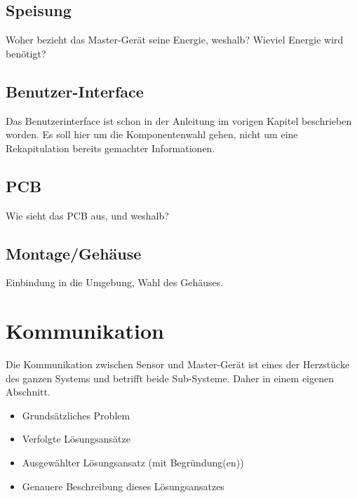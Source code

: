 \subsection{Speisung}
\label{subsec:mastergerat:speisung}

Woher bezieht das Master-Ger\"at  seine Energie, weshalb? Wieviel Energie wird
ben\"otigt?


\subsection{Benutzer-Interface}
\label{subsec:mastergerat:interface}

\anweisung Das Benutzerinterface ist schon in der Anleitung im vorigen Kapitel
beschrieben worden. Es soll  hier um die Komponentenwahl gehen,  nicht um eine
Rekapitulation bereits gemachter Informationen.

\subsection{PCB}
\label{subsec:mastergerat:pcb}

Wie sieht das PCB aus, und weshalb?

\subsection{Montage/Geh\"ause}
\label{subsec:mastergerat:pcb}

Einbindung in die Umgebung, Wahl des Geh\"auses.


\section{Kommunikation}
\label{sec:kommunikation}

Die   Kommunikation  zwischen   Sensor  und   Master-Ger\"at  ist   eines  der
Herzst\"ucke des ganzen Systems und betrifft beide Sub-Systeme. Daher in einem
eigenen Abschnitt.

\begin{itemize}
    \item
        Grunds\"atzliches Problem
    \item
        Verfolgte L\"osungsans\"atze
    \item
        Ausgew\"ahlter L\"osungsansatz (mit Begr\"undung(en))
    \item
        Genauere Beschreibung dieses L\"osungsansatzes
\end{itemize}
